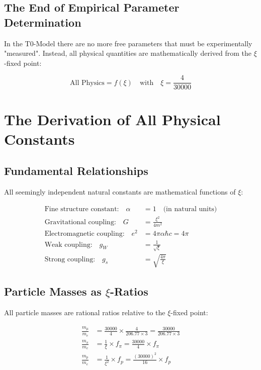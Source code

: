 \documentclass[12pt,a4paper]{report}
\begin{document}
	\subsection{The End of Empirical Parameter Determination}
	
	In the T0-Model there are no more free parameters that must be experimentally "measured". Instead, all physical quantities are mathematically derived from the $\xi$-fixed point:
	
	\begin{equation}
		\boxed{\text{All Physics} = f(\xi) \quad \text{with} \quad \xi = \frac{4}{30000}}
	\end{equation}
	
	\section{The Derivation of All Physical Constants}
	
	\subsection{Fundamental Relationships}
	
	All seemingly independent natural constants are mathematical functions of $\xi$:
	
	\begin{align}
		\text{Fine structure constant:} \quad \alpha &= 1 \quad \text{(in natural units)} \\
		\text{Gravitational coupling:} \quad G &= \frac{\xi^2}{4m^2} \\
		\text{Electromagnetic coupling:} \quad e^2 &= 4\pi\alpha\hbar c = 4\pi \\
		\text{Weak coupling:} \quad g_W &= \frac{1}{\sqrt{\xi}} \\
		\text{Strong coupling:} \quad g_s &= \sqrt{\frac{4\pi}{\xi}}
	\end{align}
	
\subsection{Particle Masses as $\xi$-Ratios}

All particle masses are rational ratios relative to the $\xi$-fixed point:

\begin{align}
	\frac{m_\mu}{m_e} &= \frac{30000}{4} \times \frac{4}{206.77 \times 3} = \frac{30000}{206.77 \times 3} \\
	\frac{m_\pi}{m_e} &= \frac{1}{\xi} \times f_{\pi} = \frac{30000}{4} \times f_{\pi} \\
	\frac{m_p}{m_e} &= \frac{1}{\xi^2} \times f_p = \frac{(30000)^2}{16} \times f_p
\end{align}
\end{document}
